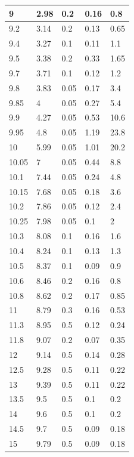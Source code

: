 \documentclass[11pt, a4paper, abstract=true]{scrartcl}
\begin{document}
{\begin{longtable}{|l|l|l|l|l|}
    9     & 2.98  & 0.2  & 0.16 & 0.8  \\ \hline
    9.2   & 3.14  & 0.2  & 0.13 & 0.65 \\ \hline
    9.4   & 3.27  & 0.1  & 0.11 & 1.1  \\ \hline
    9.5   & 3.38  & 0.2  & 0.33 & 1.65 \\ \hline
    9.7   & 3.71  & 0.1  & 0.12 & 1.2  \\ \hline
    9.8   & 3.83  & 0.05 & 0.17 & 3.4  \\ \hline
    9.85  & 4     & 0.05 & 0.27 & 5.4  \\ \hline
    9.9   & 4.27  & 0.05 & 0.53 & 10.6 \\ \hline
    9.95  & 4.8   & 0.05 & 1.19 & 23.8 \\ \hline
    10    & 5.99  & 0.05 & 1.01 & 20.2 \\ \hline
    10.05 & 7     & 0.05 & 0.44 & 8.8  \\ \hline
    10.1  & 7.44  & 0.05 & 0.24 & 4.8  \\ \hline
    10.15 & 7.68  & 0.05 & 0.18 & 3.6  \\ \hline
    10.2  & 7.86  & 0.05 & 0.12 & 2.4  \\ \hline
    10.25 & 7.98  & 0.05 & 0.1  & 2    \\ \hline
    10.3  & 8.08  & 0.1  & 0.16 & 1.6  \\ \hline
    10.4  & 8.24  & 0.1  & 0.13 & 1.3  \\ \hline
    10.5  & 8.37  & 0.1  & 0.09 & 0.9  \\ \hline
    10.6  & 8.46  & 0.2  & 0.16 & 0.8  \\ \hline
    10.8  & 8.62  & 0.2  & 0.17 & 0.85 \\ \hline
    11    & 8.79  & 0.3  & 0.16 & 0.53 \\ \hline
    11.3  & 8.95  & 0.5  & 0.12 & 0.24 \\ \hline
    11.8  & 9.07  & 0.2  & 0.07 & 0.35 \\ \hline
    12    & 9.14  & 0.5  & 0.14 & 0.28 \\ \hline
    12.5  & 9.28  & 0.5  & 0.11 & 0.22 \\ \hline
    13    & 9.39  & 0.5  & 0.11 & 0.22 \\ \hline
    13.5  & 9.5   & 0.5  & 0.1  & 0.2  \\ \hline
    14    & 9.6   & 0.5  & 0.1  & 0.2  \\ \hline
    14.5  & 9.7   & 0.5  & 0.09 & 0.18 \\ \hline
    15    & 9.79  & 0.5  & 0.09 & 0.18 \\ \hline

\end{longtable}}
\end{document}
